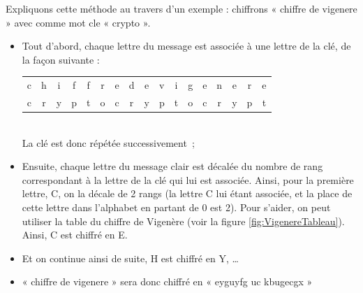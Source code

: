 Expliquons cette méthode au travers d'un exemple : chiffrons « chiffre
de vigenere » avec comme mot cle « crypto ».
\begin{itemize}
  \item Tout d'abord, chaque lettre du message est associée à une
    lettre de la clé, de la façon suivante : \\
    \begin{tabular}{c@{}c@{}c@{}c@{}c@{}c@{}cc@{}cc@{}c@{}c@{}c@{}c@{}c@{}c@{}c}
      c & h & i & f & f & r & e &
      d & e &
      v & i & g & e & n & e & r & e \\

      c & r & y & p & t & o & c & 
      r & y & 
      p & t & o & c & r & y & p & t \\
    \end{tabular}\\
    La clé est donc répétée successivement~;
  \item Ensuite, chaque lettre du message clair est décalée du nombre
    de rang correspondant à la lettre de la clé qui lui est
    associée. Ainsi, pour la première lettre, C, on la décale de 2
    rangs (la lettre C lui étant associée, et la place de cette lettre
    dans l'alphabet en partant de 0 est 2). Pour s'aider, on peut
    utiliser la table du chiffre de Vigenère (voir la figure
    \ref{fig:VigenereTableau}). \\
    Ainsi, C est chiffré en E.
  \item Et on continue ainsi de suite, H est chiffré en Y, \dots
  \item « chiffre de vigenere » sera donc chiffré en « eyguyfg uc
    kbugecgx »
\end{itemize}

